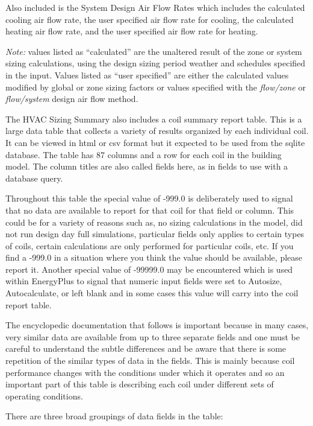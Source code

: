 Also included is the System Design Air Flow Rates which includes the calculated cooling air flow rate, the user specified air flow rate for cooling, the calculated heating air flow rate, and the user specified air flow rate for heating.

\emph{Note:} values listed as ``calculated'' are the unaltered result of the zone or system sizing calculations, using the design sizing period weather and schedules specified in the input. Values listed as ``user specified'' are either the calculated values modified by global or zone sizing factors or values specified with the \emph{flow/zone} or \emph{flow/system} design air flow method.

The HVAC Sizing Summary also includes a coil summary report table. This is a large data table that collects a variety of results organized by each individual coil.  It can be viewed in html or csv format but it expected to be used from the sqlite database.  The table has 87 columns and a row for each coil in the building model.  The column titles are also called fields here, as in fields to use with a database query. 

Throughout this table the special value of -999.0 is deliberately used to signal that no data are available to report for that coil for that field or column.  This could be for a variety of reasons such as, no sizing calculations in the model, did not run design day full simulations, particular fields only applies to certain types of coils, certain calculations are only performed for particular coils, etc.  If you find a -999.0 in a situation where you think the value should be available, please report it.  Another special value of -99999.0 may be encountered which is used within EnergyPlus to signal that numeric input fields were set to Autosize, Autocalculate, or left blank and in some cases this value will carry into the coil report table.

The encyclopedic documentation that follows is important because in many cases, very similar data are available from up to three separate fields and one must be careful to understand the subtle differences and be aware that there is some repetition of the similar types of data in the fields.  This is mainly because coil performance changes with the conditions under which it operates and so an important part of this table is describing each coil under different sets of operating conditions.

There are three broad groupings of data fields in the table:

